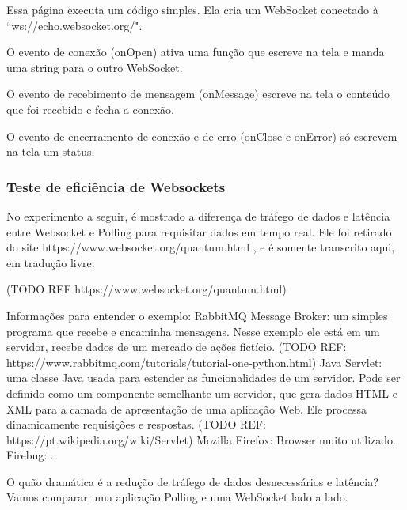 \documentclass[a4paper,12pt]{article}
\begin{document}
Essa página executa um código simples. Ela cria um WebSocket conectado à “ws://echo.websocket.org/".

O evento de conexão (onOpen) ativa uma função que escreve na tela e manda uma string para o outro WebSocket.

O evento de recebimento de mensagem (onMessage) escreve na tela o conteúdo que foi recebido e fecha a conexão.

O evento de encerramento de conexão e de erro (onClose e onError) só escrevem na tela um status.





\subsubsection{Teste de eficiência de Websockets}


No experimento a seguir, é mostrado a diferença de tráfego de dados e latência entre Websocket e Polling para requisitar dados em tempo real. Ele foi retirado do site https://www.websocket.org/quantum.html , e é somente transcrito aqui, em tradução livre:

(TODO REF https://www.websocket.org/quantum.html)


Informações para entender o exemplo:
RabbitMQ Message Broker: um simples programa que recebe e encaminha mensagens. Nesse exemplo ele está em um servidor, recebe dados de um mercado de ações fictício. (TODO REF: https://www.rabbitmq.com/tutorials/tutorial-one-python.html)
Java Servlet: uma classe Java usada para estender as funcionalidades de um servidor. Pode ser definido como um componente semelhante um servidor, que gera dados HTML e XML para a camada de apresentação de uma aplicação Web. Ele processa dinamicamente requisições e respostas. (TODO REF: https://pt.wikipedia.org/wiki/Servlet)
Mozilla Firefox: Browser muito utilizado.
Firebug: .

O quão dramática é a redução de tráfego de dados desnecessários e latência? Vamos comparar uma aplicação Polling e uma WebSocket lado a lado.
\end{document}
